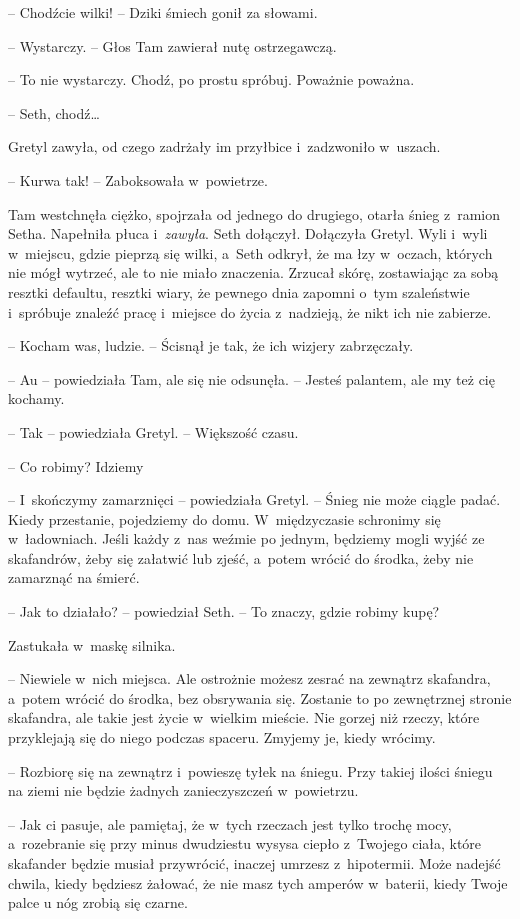 \documentclass[oneside,polish,11pt,sfheadings]{mwbk}
\begin{document}
-- Chodźcie wilki! -- Dziki śmiech gonił za słowami.

-- Wystarczy. -- Głos Tam zawierał nutę ostrzegawczą.

-- To nie wystarczy. Chodź, po prostu spróbuj. Poważnie poważna.

-- Seth, chodź\ldots 

Gretyl zawyła, od czego zadrżały im przyłbice i~zadzwoniło w~uszach. 

-- Kurwa tak! -- Zaboksowała w~powietrze.

Tam westchnęła ciężko, spojrzała od jednego do drugiego, otarła śnieg z~ramion Setha. Napełniła płuca i~\textit{zawyła}. Seth dołączył. Dołączyła
Gretyl. Wyli i~wyli w~miejscu, gdzie pieprzą się wilki, a~Seth odkrył,
że ma łzy w~oczach, których nie mógł wytrzeć, ale to nie miało
znaczenia. Zrzucał skórę, zostawiając za sobą resztki defaultu, resztki
wiary, że pewnego dnia zapomni o~tym szaleństwie i~spróbuje znaleźć
pracę i~miejsce do życia z~nadzieją, że nikt ich nie zabierze.

-- Kocham was, ludzie. -- Ścisnął je tak, że ich wizjery zabrzęczały.

-- Au -- powiedziała Tam, ale się nie odsunęła. -- Jesteś palantem, ale my
też cię kochamy.

-- Tak -- powiedziała Gretyl. -- Większość czasu.

-- Co robimy? Idziemy

-- I~skończymy zamarznięci -- powiedziała Gretyl. -- Śnieg nie może ciągle
padać. Kiedy przestanie, pojedziemy do domu. W~międzyczasie schronimy
się w~ładowniach. Jeśli każdy z~nas weźmie po jednym, będziemy mogli
wyjść ze skafandrów, żeby się załatwić lub zjeść, a~potem wrócić do
środka, żeby nie zamarznąć na śmierć.

-- Jak to działało? -- powiedział Seth. -- To znaczy, gdzie robimy kupę?

Zastukała w~maskę silnika. 

-- Niewiele w~nich miejsca. Ale ostrożnie
możesz zesrać na zewnątrz skafandra, a~potem wrócić do środka, bez
obsrywania się. Zostanie to po zewnętrznej stronie skafandra, ale takie
jest życie w~wielkim mieście. Nie gorzej niż rzeczy, które przyklejają
się do niego podczas spaceru. Zmyjemy je, kiedy wrócimy.

-- Rozbiorę się na zewnątrz i~powieszę tyłek na śniegu. Przy takiej
ilości śniegu na ziemi nie będzie żadnych zanieczyszczeń w~powietrzu.

-- Jak ci pasuje, ale pamiętaj, że w~tych rzeczach jest tylko trochę
mocy, a~rozebranie się przy minus dwudziestu wysysa ciepło z~Twojego
ciała, które skafander będzie musiał przywrócić, inaczej umrzesz z~hipotermii. Może nadejść chwila, kiedy będziesz żałować, że nie masz
tych amperów w~baterii, kiedy Twoje palce u nóg zrobią się czarne.
\end{document}
